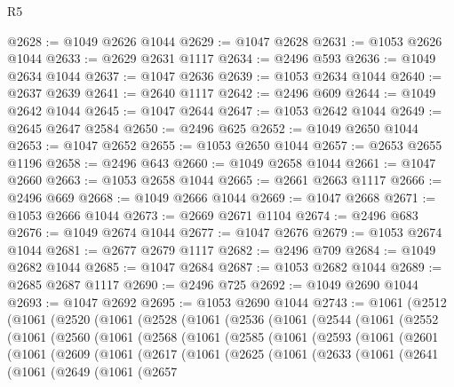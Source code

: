 \begin{lexlean}{R5}
\begin{coremodule}
@2628 := @1049 @2626 @1044
@2629 := @1047 @2628
@2631 := @1053 @2626 @1044
@2633 := @2629 @2631 @1117
@2634 := @2496 @593
@2636 := @1049 @2634 @1044
@2637 := @1047 @2636
@2639 := @1053 @2634 @1044
@2640 := @2637 @2639
@2641 := @2640 @1117
@2642 := @2496 @609
@2644 := @1049 @2642 @1044
@2645 := @1047 @2644
@2647 := @1053 @2642 @1044
@2649 := @2645 @2647 @2584
@2650 := @2496 @625
@2652 := @1049 @2650 @1044
@2653 := @1047 @2652
@2655 := @1053 @2650 @1044
@2657 := @2653 @2655 @1196
@2658 := @2496 @643
@2660 := @1049 @2658 @1044
@2661 := @1047 @2660
@2663 := @1053 @2658 @1044
@2665 := @2661 @2663 @1117
@2666 := @2496 @669
@2668 := @1049 @2666 @1044
@2669 := @1047 @2668
@2671 := @1053 @2666 @1044
@2673 := @2669 @2671 @1104
@2674 := @2496 @683
@2676 := @1049 @2674 @1044
@2677 := @1047 @2676
@2679 := @1053 @2674 @1044
@2681 := @2677 @2679 @1117
@2682 := @2496 @709
@2684 := @1049 @2682 @1044
@2685 := @1047 @2684
@2687 := @1053 @2682 @1044
@2689 := @2685 @2687 @1117
@2690 := @2496 @725
@2692 := @1049 @2690 @1044
@2693 := @1047 @2692
@2695 := @1053 @2690 @1044
@2743 := @1061
    (@2512
      (@1061
        (@2520
          (@1061
            (@2528
              (@1061
                (@2536
                  (@1061
                    (@2544
                      (@1061
                        (@2552
                          (@1061
                            (@2560
                              (@1061
                                (@2568
                                  (@1061
                                    (@2585
                                      (@1061
                                        (@2593
                                          (@1061
                                            (@2601
                                              (@1061
                                                (@2609
                                                  (@1061
                                                    (@2617
                                                      (@1061
                                                        (@2625
                                                          (@1061
                                                            (@2633
                                                              (@1061
                                                                (@2641
                                                                  (@1061
                                                                    (@2649
                                                                      (@1061
                                                                        (@2657

\end{coremodule}
\end{lexlean}
